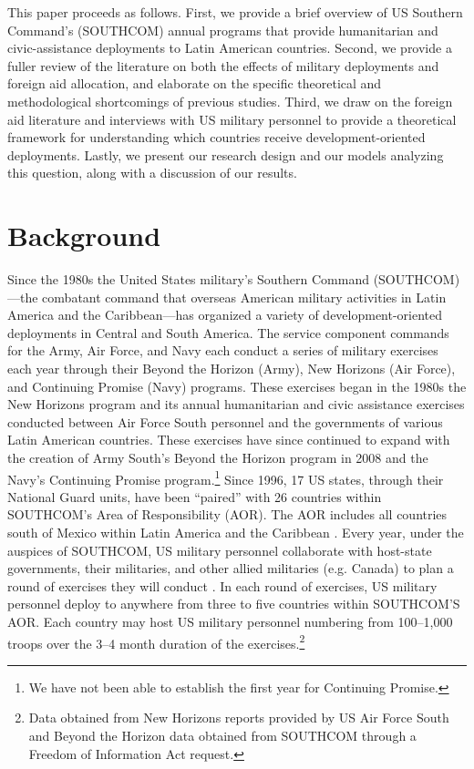 \documentclass[12pt]{article}
\begin{document}
\begin{doublespace}
This paper proceeds as follows. First, we provide a brief overview of US Southern Command's (SOUTHCOM) annual programs that provide humanitarian and civic-assistance deployments to Latin American countries. Second, we provide a fuller review of the literature on both the effects of military deployments and foreign aid allocation, and elaborate on the specific theoretical and methodological shortcomings of previous studies. Third, we draw on the foreign aid literature and interviews with US military personnel to provide a theoretical framework for understanding which countries receive development-oriented deployments. Lastly, we present our research design and our models analyzing this question, along with a discussion of our results.


\section{Background}

Since the 1980s the United States military's Southern Command (SOUTHCOM)---the combatant command that overseas American military activities in Latin America and the Caribbean---has organized a variety of development-oriented deployments in Central and South America. The service component commands for the Army, Air Force, and Navy each conduct a series of military exercises each year through their Beyond the Horizon (Army), New Horizons (Air Force), and Continuing Promise (Navy) programs. These exercises began in the 1980s the New Horizons program and its annual humanitarian and civic assistance exercises conducted between Air Force South personnel and the governments of various Latin American countries. These exercises have since continued to expand with the creation of Army South's Beyond the Horizon program in 2008 and the Navy's Continuing Promise program.\footnote{We have not been able to establish the first year for Continuing Promise.} Since 1996, 17 US states, through their National Guard units, have been ``paired'' with 26 countries within SOUTHCOM's Area of Responsibility (AOR). The AOR includes all countries south of Mexico within Latin America and the Caribbean \cite{southcom2015}. Every year, under the auspices of SOUTHCOM, US military personnel collaborate with host-state governments, their militaries, and other allied militaries (e.g. Canada) to plan a round of exercises they will conduct \cite{SouthcomStatePartner}. In each round of exercises, US military personnel deploy to anywhere from three to five countries within SOUTHCOM'S AOR. Each country may host US military personnel numbering from 100--1,000 troops over the 3--4 month duration of the exercises.\footnote{Data obtained from New Horizons reports provided by US Air Force South and Beyond the Horizon data obtained from SOUTHCOM through a Freedom of Information Act request.}


\end{doublespace}
\end{document}
